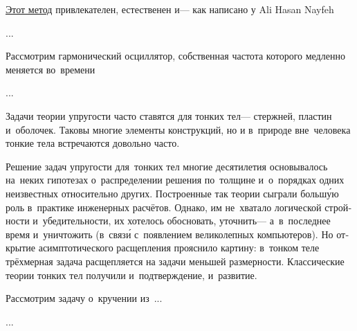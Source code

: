 \begin{otherlanguage}{russian}

\href{https://en.wikipedia.org/wiki/Multiple-scale_analysis}{Этот метод} привлекателен, естественен и\:--- как написано у Ali Hasan Nayfeh

...



\end{otherlanguage}



\begin{otherlanguage}{russian}

Рассмотрим гармонический осциллятор, собственная частота которого медленно меняется во~времени

...



\end{otherlanguage}



\begin{otherlanguage}{russian}

Задачи теории упругости часто ставятся для тонких тел\:--- стержней, пластин и~оболочек.
Таковы многие элементы конструкций, но и в~природе вне~человека тонкие тела встречаются довольно часто.

Решение задач упругости для~тонких тел многие десятилетия основывалось на~неких гипотезах о~распределении решения по~толщине и~о~порядках одних неизвестных относительно других.
Построенные так теории сыграли больш\'{у}ю роль в~практике инженерных расчётов.
Однако, им не~хватало логической стройности и~убедительности, их хотелось обосновать, уточнить\:--- а~в~последнее время и~уничтожить (в~связ\'{и} с~появлением великолепных компьютеров).
Но открытие асимптотического расщепления прояснило картину: в~тонком теле трёхмерная задача расщепляется на задачи меньшей размерности.
Классические теории тонких тел получили и~подтверждение, и~развитие.

Рассмотрим задачу о~кручении из~...

...




\end{otherlanguage}


